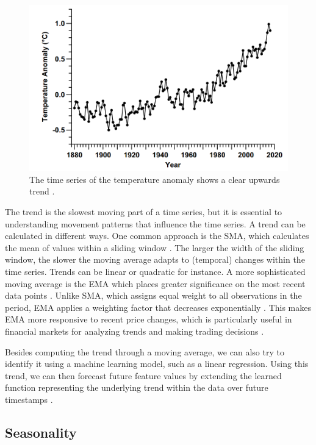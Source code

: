 \begin{figure}[h]
    \centering
    \includegraphics[width=0.75\linewidth]{img/Time Series Trend.png}
    \caption{The time series of the temperature anomaly shows a clear upwards trend
        \parencite[p. 311]{mudelsee2019trend}.}
    \label{fig:ts_trend}
\end{figure}

The trend is the slowest moving part of a time series, but it is essential
to understanding movement patterns that influence the time series. A trend can
be calculated in different ways. One common approach is the \ac{SMA}, which
calculates the mean of values within a sliding window \parencite{klinker2011exponential}.
The larger the width of the sliding window, the slower the moving average adapts
to (temporal) changes within the time series. Trends can be linear or quadratic
for instance. A more sophisticated moving average is the \ac{EMA} which places
greater significance on the most recent data points \parencite{hansun2013new}.
Unlike \ac{SMA}, which assigns equal weight to all observations in the period,
\ac{EMA} applies a weighting factor that decreases exponentially
\parencite{klinker2011exponential}. This makes \ac{EMA} more responsive to
recent price changes, which is particularly useful in financial markets for
analyzing trends and making trading decisions \parencite{dzikevivcius2010ema}.

Besides computing the trend through a moving average, we can also try to identify
it using a machine learning model, such as a linear regression. Using this trend, we
can then forecast future feature values by extending the learned function
representing the underlying trend within the data over future timestamps
\parencite{prophetpaper}.

\subsection{Seasonality}
\label{subsec:seasonality}

